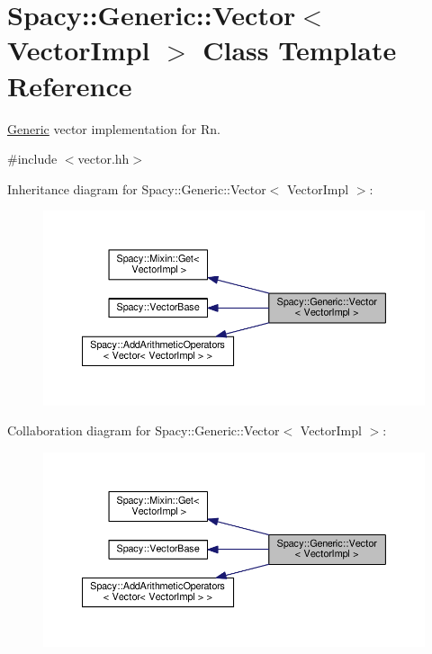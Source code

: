\hypertarget{classSpacy_1_1Generic_1_1Vector}{}\section{Spacy\+:\+:Generic\+:\+:Vector$<$ Vector\+Impl $>$ Class Template Reference}
\label{classSpacy_1_1Generic_1_1Vector}


\hyperlink{namespaceSpacy_1_1Generic}{Generic} vector implementation for Rn.  




{\ttfamily \#include $<$vector.\+hh$>$}



Inheritance diagram for Spacy\+:\+:Generic\+:\+:Vector$<$ Vector\+Impl $>$\+:
\nopagebreak
\begin{figure}[H]
\begin{center}
\leavevmode
\includegraphics[width=350pt]{classSpacy_1_1Generic_1_1Vector__inherit__graph}
\end{center}
\end{figure}


Collaboration diagram for Spacy\+:\+:Generic\+:\+:Vector$<$ Vector\+Impl $>$\+:
\nopagebreak
\begin{figure}[H]
\begin{center}
\leavevmode
\includegraphics[width=350pt]{classSpacy_1_1Generic_1_1Vector__coll__graph}
\end{center}
\end{figure}
